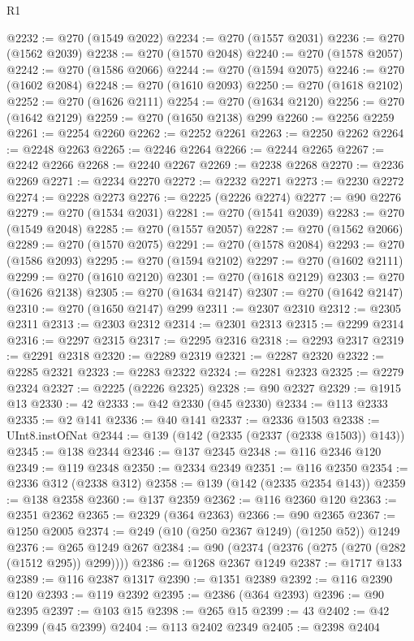 \begin{lexlean}{R1}
\begin{coremodule}
@2232 := @270 (@1549 @2022)
@2234 := @270 (@1557 @2031)
@2236 := @270 (@1562 @2039)
@2238 := @270 (@1570 @2048)
@2240 := @270 (@1578 @2057)
@2242 := @270 (@1586 @2066)
@2244 := @270 (@1594 @2075)
@2246 := @270 (@1602 @2084)
@2248 := @270 (@1610 @2093)
@2250 := @270 (@1618 @2102)
@2252 := @270 (@1626 @2111)
@2254 := @270 (@1634 @2120)
@2256 := @270 (@1642 @2129)
@2259 := @270 (@1650 @2138) @299
@2260 := @2256 @2259
@2261 := @2254 @2260
@2262 := @2252 @2261
@2263 := @2250 @2262
@2264 := @2248 @2263
@2265 := @2246 @2264
@2266 := @2244 @2265
@2267 := @2242 @2266
@2268 := @2240 @2267
@2269 := @2238 @2268
@2270 := @2236 @2269
@2271 := @2234 @2270
@2272 := @2232 @2271
@2273 := @2230 @2272
@2274 := @2228 @2273
@2276 := @2225 (@2226 @2274)
@2277 := @90 @2276
@2279 := @270 (@1534 @2031)
@2281 := @270 (@1541 @2039)
@2283 := @270 (@1549 @2048)
@2285 := @270 (@1557 @2057)
@2287 := @270 (@1562 @2066)
@2289 := @270 (@1570 @2075)
@2291 := @270 (@1578 @2084)
@2293 := @270 (@1586 @2093)
@2295 := @270 (@1594 @2102)
@2297 := @270 (@1602 @2111)
@2299 := @270 (@1610 @2120)
@2301 := @270 (@1618 @2129)
@2303 := @270 (@1626 @2138)
@2305 := @270 (@1634 @2147)
@2307 := @270 (@1642 @2147)
@2310 := @270 (@1650 @2147) @299
@2311 := @2307 @2310
@2312 := @2305 @2311
@2313 := @2303 @2312
@2314 := @2301 @2313
@2315 := @2299 @2314
@2316 := @2297 @2315
@2317 := @2295 @2316
@2318 := @2293 @2317
@2319 := @2291 @2318
@2320 := @2289 @2319
@2321 := @2287 @2320
@2322 := @2285 @2321
@2323 := @2283 @2322
@2324 := @2281 @2323
@2325 := @2279 @2324
@2327 := @2225 (@2226 @2325)
@2328 := @90 @2327
@2329 := @1915 @13
@2330 := 42
@2333 := @42 @2330 (@45 @2330)
@2334 := @113 @2333
@2335 := @2 @141
@2336 := @40 @141
@2337 := @2336 @1503
@2338 := UInt8.instOfNat
@2344 := @139 (@142 (@2335 (@2337 (@2338 @1503)) @143))
@2345 := @138 @2344
@2346 := @137 @2345
@2348 := @116 @2346 @120
@2349 := @119 @2348
@2350 := @2334 @2349
@2351 := @116 @2350
@2354 := @2336 @312 (@2338 @312)
@2358 := @139 (@142 (@2335 @2354 @143))
@2359 := @138 @2358
@2360 := @137 @2359
@2362 := @116 @2360 @120
@2363 := @2351 @2362
@2365 := @2329 (@364 @2363)
@2366 := @90 @2365
@2367 := @1250 @2005
@2374 := @249 (@10 (@250 @2367 @1249) (@1250 @52)) @1249
@2376 := @265 @1249 @267
@2384 := @90 (@2374 (@2376 (@275 (@270 (@282 (@1512 @295)) @299))))
@2386 := @1268 @2367 @1249
@2387 := @1717 @133
@2389 := @116 @2387 @1317
@2390 := @1351 @2389
@2392 := @116 @2390 @120
@2393 := @119 @2392
@2395 := @2386 (@364 @2393)
@2396 := @90 @2395
@2397 := @103 @15
@2398 := @265 @15
@2399 := 43
@2402 := @42 @2399 (@45 @2399)
@2404 := @113 @2402 @2349
@2405 := @2398 @2404

\end{coremodule}
\end{lexlean}
